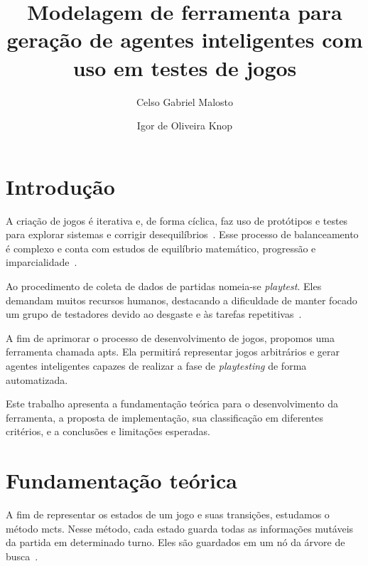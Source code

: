 \documentclass[12pt]{article}
\title{Modelagem de ferramenta para geração de agentes inteligentes com uso em testes de jogos}
\author{%
    Celso Gabriel Malosto\inst{1}%
    \and%
    Igor de Oliveira Knop\inst{1}
}
\begin{document}
\maketitle

\begin{abstract}

\end{abstract}

\begin{resumo}

\end{resumo}

\section{Introdução}%
\label{sec:introducao}

A criação de jogos é iterativa e, de forma cíclica, faz uso de protótipos e testes para explorar sistemas e corrigir desequilíbrios~\cite{marcelo2009design, fullerton2019game}.
Esse processo de balanceamento é complexo e conta com estudos de equilíbrio matemático, progressão e imparcialidade~\cite{romeroGameBalance2021}.

Ao procedimento de coleta de dados de partidas nomeia-se \textit{playtest}.
Eles demandam muitos recursos humanos, destacando a dificuldade de manter focado um grupo de testadores devido ao desgaste e às tarefas repetitivas~\cite{trzewiczek2017}.

A fim de aprimorar o processo de desenvolvimento de jogos, propomos uma ferramenta chamada \gls{apts}.
Ela permitirá representar jogos arbitrários e gerar agentes inteligentes capazes de realizar a fase de \textit{playtesting} de forma automatizada.

Este trabalho apresenta a fundamentação teórica para o desenvolvimento da ferramenta, a proposta de implementação, sua classificação em diferentes critérios, e a conclusões e limitações esperadas.

\section{Fundamentação teórica}%
\label{sec:fundamentacao_teorica}

A fim de representar os estados de um jogo e suas transições, estudamos o método \gls{mcts}.
Nesse método, cada estado guarda todas as informações mutáveis da partida em determinado turno.
Eles são guardados em um nó da árvore de busca~\cite{kocsis2006bandit, coulom2006efficient}.
\end{document}
